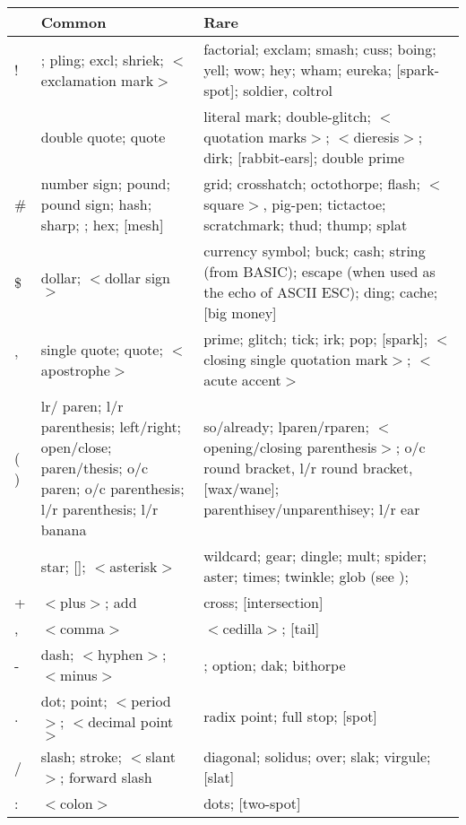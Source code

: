 \begin{table*}
	\renewcommand{\arraystretch}{1.3}
	\begin{tabular}{>{\raggedright\arraybackslash}p{1cm}%
			>{\raggedright\arraybackslash}p{}%
			>{\raggedright\arraybackslash}p{}}
		\toprule
		&\textbf{Common}&\textbf{Rare}\\
		\midrule
		!&\citeentry{bang}; pling; excl; shriek; $<$exclamation
		mark$>$&factorial; exclam; smash; cuss; boing; yell; wow; hey; wham;
		eureka; [spark-spot]; soldier, coltrol\\
		\textquotedbl\textquotedbl&double quote; quote&literal mark;
		double-glitch; $<$quotation marks$>$; $<$dieresis$>$; dirk;
		[rabbit-ears]; double prime\\
		\#&number sign; pound; pound sign; hash; sharp; \citeentry{crunch};
		hex; [mesh]&grid; crosshatch; octothorpe; flash; $<$square$>$, pig-pen;
		tictactoe; scratchmark; thud; thump; splat\\
		\$&dollar; $<$dollar sign$>$&currency symbol; buck; cash; string (from
		BASIC); escape (when used as the echo of ASCII ESC); ding; cache; [big
		money]\\
		'&single quote; quote; $<$apostrophe$>$&prime; glitch; tick; irk; pop;
		[spark]; $<$closing single quotation mark$>$; $<$acute accent$>$\\
		( )&lr/ paren; l/r parenthesis; left/right; open/close; paren/thesis;
		o/c paren; o/c parenthesis; l/r parenthesis; l/r banana&so/already;
		lparen/rparen; $<$opening/closing parenthesis$>$; o/c round bracket,
		l/r round bracket, [wax/wane]; parenthisey/unparenthisey; l/r ear\\
		*&star; [\citeentry{splat}]; $<$asterisk$>$&wildcard; gear; dingle;
		mult; spider; aster; times; twinkle; glob (see \citeentry{glob});
		\citeentry{Nathan Hale}\\
		+&$<$plus$>$; add&cross; [intersection]\\
		,&$<$comma$>$&$<$cedilla$>$; [tail]\\
		-&dash; $<$hyphen$>$; $<$minus$>$&[worm]; option; dak; bithorpe\\
		.&dot; point; $<$period$>$; $<$decimal point$>$&radix point; full stop;
		[spot]\\
		/&slash; stroke; $<$slant$>$; forward slash&diagonal; solidus; over;
		slak; virgule; [slat]\\
		:&$<$colon$>$&dots; [two-spot]\\

\end{tabular}
\end{table*}
